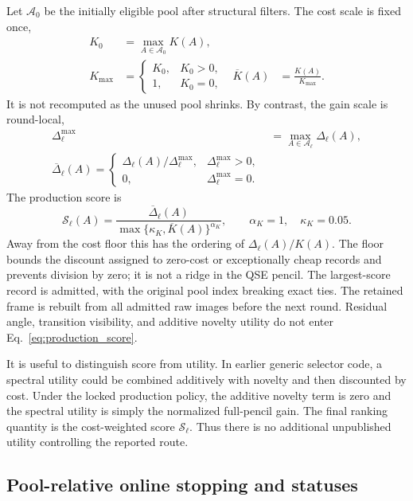 \documentclass[
  reprint,
  amsmath,
  amssymb,
  aps,
  pra,
  nofootinbib,
  superscriptaddress,
  floatfix
]{revtex4-2}
\newcommand{\score}{\mathcal{S}}
\begin{document}
Let $\mathcal A_0$ be the initially eligible pool after structural filters.
The cost scale is fixed once,
\begin{align}
 K_0&=\max_{A\in\mathcal A_0}K(A),
 \nonumber\\
 K_{\max}&=\begin{cases}
 K_0,&K_0>0,\\
 1,&K_0=0,
 \end{cases}
 &\overline K(A)&=\frac{K(A)}{K_{\max}}.
 \label{eq:fixed_cost_normalization}
\end{align}
It is not recomputed as the unused pool shrinks.  By contrast, the gain scale
is round-local,
\begin{align}
 \Delta_\ell^{\max}
 &=\max_{A\in\mathcal A_\ell}\Delta_\ell(A),
 \nonumber\\
 \overline\Delta_\ell(A)=
 \begin{cases}
 \Delta_\ell(A)/\Delta_\ell^{\max},&\Delta_\ell^{\max}>0,\\
 0,&\Delta_\ell^{\max}=0.
 \end{cases}
 \label{eq:round_gain_normalization}
\end{align}
The production score is
\begin{equation}
 \score_\ell(A)=
 \frac{\overline\Delta_\ell(A)}
 {\max\{\kappa_K,\overline K(A)\}^{\alpha_K}},
 \qquad \alpha_K=1,\quad\kappa_K=0.05.
 \label{eq:production_score}
\end{equation}
Away from the cost floor this has the ordering of $\Delta_\ell(A)/K(A)$.
The floor bounds the discount assigned to zero-cost or exceptionally cheap
records and prevents division by zero; it is not a ridge in the QSE pencil.
The largest-score record is admitted, with the original pool index breaking
exact ties.  The retained frame is rebuilt from all admitted raw images
before the next round.  Residual angle, transition visibility, and additive
novelty utility do not enter Eq.~\eqref{eq:production_score}.

It is useful to distinguish score from utility.  In earlier generic selector
code, a spectral utility could be combined additively with novelty and then
discounted by cost.  Under the locked production policy, the additive
novelty term is zero and the spectral utility is simply the normalized
full-pencil gain.  The final ranking quantity is the cost-weighted score
$\score_\ell$.  Thus there is no additional unpublished utility controlling
the reported route.

\subsection{Pool-relative online stopping and statuses}
\label{sec:online_stopping}
\end{document}
